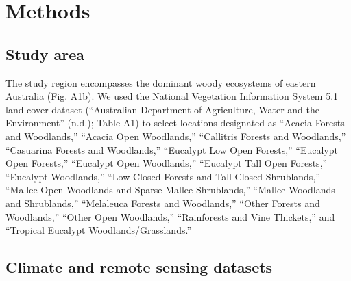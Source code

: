 \documentclass[
]{article}
\begin{document}
\hypertarget{methods}{%
\section{Methods}\label{methods}}

\hypertarget{study-area}{%
\subsection{Study area}\label{study-area}}

The study region encompasses the dominant woody ecosystems of eastern
Australia (Fig. A1b). We used the National Vegetation Information System
5.1 land cover dataset ({``Australian Department of {Agriculture},
{Water} and the {Environment}''} (n.d.); Table A1) to select locations
designated as ``Acacia Forests and Woodlands,'' ``Acacia Open
Woodlands,'' ``Callitris Forests and Woodlands,'' ``Casuarina Forests
and Woodlands,'' ``Eucalypt Low Open Forests,'' ``Eucalypt Open
Forests,'' ``Eucalypt Open Woodlands,'' ``Eucalypt Tall Open Forests,''
``Eucalypt Woodlands,'' ``Low Closed Forests and Tall Closed
Shrublands,'' ``Mallee Open Woodlands and Sparse Mallee Shrublands,''
``Mallee Woodlands and Shrublands,'' ``Melaleuca Forests and
Woodlands,'' ``Other Forests and Woodlands,'' ``Other Open Woodlands,''
``Rainforests and Vine Thickets,'' and ``Tropical Eucalypt
Woodlands/Grasslands.''

\hypertarget{climate-and-remote-sensing-datasets}{%
\subsection{Climate and remote sensing
datasets}\label{climate-and-remote-sensing-datasets}}
\end{document}
